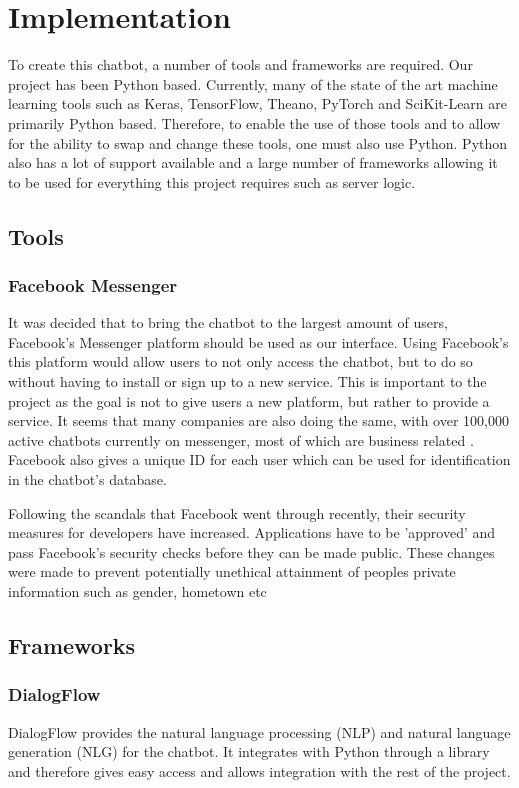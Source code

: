 \documentclass[12pt,a4paper]{article}
\begin{document}
    \section{Implementation}
    
    To create this chatbot, a number of tools and frameworks are required. Our project has been Python based. Currently, many of the state of the art machine learning tools such as Keras, TensorFlow, Theano, PyTorch and SciKit-Learn are primarily Python based. Therefore, to enable the use of those tools and to allow for the ability to swap and change these tools, one must also use Python. Python also has a lot of support available and a large number of frameworks allowing it to be used for everything this project requires such as server logic.
    
    \subsection{Tools}
    \subsubsection{Facebook Messenger}
    It was decided that to bring the chatbot to the largest amount of users, Facebook's Messenger platform should be used as our interface. Using Facebook's this platform would allow users to not only access the chatbot, but to do so without having to install or sign up to a new service. This is important to the project as the goal is not to give users a new platform, but rather to provide a service. It seems that many companies are also doing the same, with over 100,000 active chatbots currently on messenger, most of which are business related \citep{Parr17}. Facebook also gives a unique ID for each user which can be used for identification in the chatbot's database. 
    
    Following the scandals that Facebook went through recently, their security measures for developers have increased. Applications have to be 'approved' and pass Facebook's security checks before they can be made public. These changes were made to prevent potentially unethical attainment of peoples private information such as gender, hometown etc \citep{Perez18}
    
    \subsection{Frameworks}
    
    \subsubsection{DialogFlow}
    DialogFlow provides the natural language processing (NLP) and natural language generation (NLG) for the chatbot. It integrates with Python through a library and therefore gives easy access and allows integration with the rest of the project.
    
\end{document}
